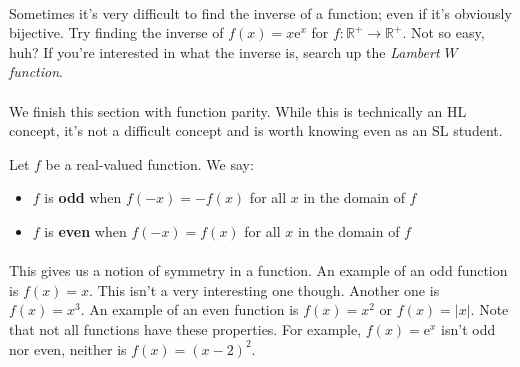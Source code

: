 \documentclass[12pt, a4paper, titlepage, twoside]{article}
\newcommand*{\R}{\mathbb{R}}
\newcommand*{\e}{\textrm{e}}
\begin{document}
	\paragraph{}
	Sometimes it's very difficult to find the inverse of a function; even if it's obviously bijective. Try finding the inverse of 
	$f(x) = x\e^x$ for $f : \R^+ \to \R^+$. Not so easy, huh? If you're interested in what the inverse is, search up the
	\textit{Lambert $W$ function}.
	
	\paragraph{}
	We finish this section with function parity. While this is technically an HL concept, it's not a difficult concept and is worth knowing even as
	an SL student.\\
	
	\begin{kp}
		Let $f$ be a real-valued function. We say:
		\begin{itemize}
			\item $f$ is \textbf{odd} when $f(-x) = -f(x)$ for all $x$ in the domain of $f$
			\item $f$ is \textbf{even} when $f(-x) = f(x)$ for all $x$ in the domain of $f$
		\end{itemize}		
	\end{kp}
	
	\paragraph{}
	This gives us a notion of symmetry in a function. An example of an odd function is $f(x) = x$. This isn't a very interesting one though.
	Another one is $f(x) = x^3$. An example of an even function is $f(x) = x^2$ or $f(x) = |x|$. Note that not all functions have these properties. 
	For example, $f(x) = \e^x$ isn't odd nor even, neither is $f(x) = (x-2)^2$.\\
	
\end{document}
